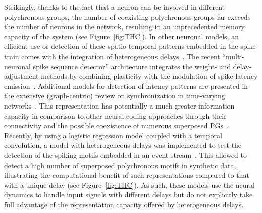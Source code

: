 \documentclass[brainsci, %
               review,submit,pdftex,moreauthors
               ]{Definitions/mdpi}
\begin{document}
Strikingly, thanks to the fact that a neuron can be involved in different polychronous groups, the number of coexisting polychronous groups far exceeds the number of neurons in the network, resulting in an unprecedented memory capacity of the system (see Figure~\ref{fig:THC}). In other neuronal models, an efficient use or detection of these spatio-temporal patterns embedded in the spike train comes with the integration of heterogeneous delays~\citep{guise_bayesian_2014,zhang_supervised_2020}. The recent ``multi-neuronal spike sequence detector'' architecture integrates the weight- and delay-adjustment methods by combining plasticity with the modulation of spike latency emission~\citep{susi_nmnsd-spiking_2021}. Additional models for detection of latency patterns are presented in the extensive (graph-centric) review on synchronization in time-varying networks~\citep{ghosh_synchronization_2021,ghosh_synchronized_2022}. This representation has potentially a much greater information capacity in comparison to other neural coding approaches through their connectivity and the possible coexistence of numerous superposed PGs~\citep{izhikevich_polychronous_2009}. Recently, by using a logistic regression model coupled with a temporal convolution, a model with heterogeneous delays was implemented to test the detection of the spiking motifs embedded in an event stream~\citep{grimaldi_learning_2022}. This allowed to detect a high number of superposed polychronous motifs in synthetic data, illustrating the computational benefit of such representations compared to that with a unique delay (see Figure~\ref{fig:THC}). As such, these models use the neural dynamics to handle input signals with different delays but do not explicitly take full advantage of the representation capacity offered by heterogeneous delays. 
%
%
\end{document}
